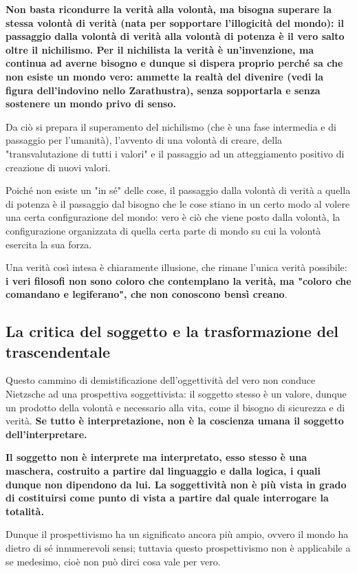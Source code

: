 \textbf{Non basta ricondurre la verità alla volontà, ma bisogna superare la stessa volontà di verità (nata per sopportare l'illogicità del mondo): il passaggio dalla volontà di verità alla volontà di potenza è il vero salto oltre il nichilismo. Per il nichilista la verità è un'invenzione, ma continua ad averne bisogno e dunque si dispera proprio perché sa che non esiste un mondo vero: ammette la realtà del divenire (vedi la figura dell'indovino nello Zarathustra), senza sopportarla e senza sostenere un mondo privo di senso.}

Da ciò si prepara il superamento del nichilismo (che è una fase intermedia e di passaggio per l'umanità), l'avvento di una volontà di creare, della "transvalutazione di tutti i valori" e il passaggio ad un atteggiamento positivo di creazione di nuovi valori.

Poiché non esiste un "in sé" delle cose, il passaggio dalla volontà di verità a quella di potenza è il passaggio dal bisogno che le cose stiano in un certo modo al volere una certa configurazione del mondo: vero è ciò che viene posto dalla volontà, la configurazione organizzata di quella certa parte di mondo su cui la volontà esercita la sua forza.

Una verità così intesa è chiaramente illusione, che rimane l'unica verità possibile: \textbf{i veri filosofi non sono coloro che contemplano la verità, ma "coloro che comandano e legiferano", che non conoscono bensì creano}.

\subsection{La critica del soggetto e la trasformazione del trascendentale}

Questo cammino di demistificazione dell'oggettività del vero non conduce Nietzsche ad una prospettiva soggettivista: il soggetto stesso è un valore, dunque un prodotto della volontà e necessario alla vita, come il bisogno di sicurezza e di verità.\textbf{ Se tutto è interpretazione, non è la coscienza umana il soggetto dell'interpretare.}

\textbf{Il soggetto non è interprete ma interpretato, esso stesso è una maschera, costruito a partire dal linguaggio e dalla logica, i quali dunque non dipendono da lui. La soggettività non è più vista in grado di costituirsi come punto di vista a partire dal quale interrogare la totalità.}

Dunque il prospettivismo ha un significato ancora più ampio, ovvero il mondo ha dietro di sé innumerevoli sensi; tuttavia questo prospettivismo non è applicabile a se medesimo, cioè non può dirci cosa vale per vero.

